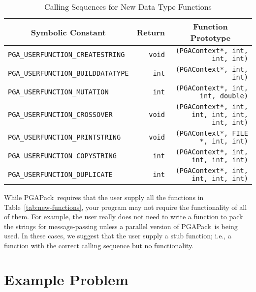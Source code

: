 \documentclass{report}
\newcommand{\pga}{PGAPack}
\begin{document}
\begin{table}
\centering
\caption
{
Calling Sequences for New Data Type Functions\label{tab:new-functions1}
}
\begin{tabular}{|l|r|r|} \hline\hline
\multicolumn{1}{|c|}{Symbolic Constant} &
\multicolumn{1}{|c|}{Return} &
\multicolumn{1}{c|}{Function Prototype} \\ \hline
{\tt PGA\_USERFUNCTION\_CREATESTRING}&{\tt void}&{\tt (PGAContext*, int, int, int)}\\
{\tt PGA\_USERFUNCTION\_BUILDDATATYPE}&{\tt int}&{\tt (PGAContext*, int, int)}\\
{\tt PGA\_USERFUNCTION\_MUTATION}&{\tt int}&{\tt (PGAContext*, int, int, double)}\\
{\tt PGA\_USERFUNCTION\_CROSSOVER}&{\tt void}&{\tt (PGAContext*, int, int, int, int, int, int)}\\
{\tt PGA\_USERFUNCTION\_PRINTSTRING}&{\tt void}&{\tt (PGAContext*, FILE *, int, int)}\\
{\tt PGA\_USERFUNCTION\_COPYSTRING}&{\tt int}&{\tt (PGAContext*, int, int,
int, int)}\\
{\tt PGA\_USERFUNCTION\_DUPLICATE}&{\tt int}&{\tt (PGAContext*, int, int, int, int)}\\
\hline
\end{tabular}
\end{table}

While \pga\ requires that the user supply all the functions in
Table~\ref{tab:new-functions}, your program may not require the functionality
of all of them.  For example, the user really does not need to write a
function to pack the strings for message-passing unless a parallel version of
\pga\ is being used.  In these cases, we
suggest that the user supply a stub function; i.e., a function with the
correct calling sequence but no functionality.


\section{Example Problem}
\end{document}
